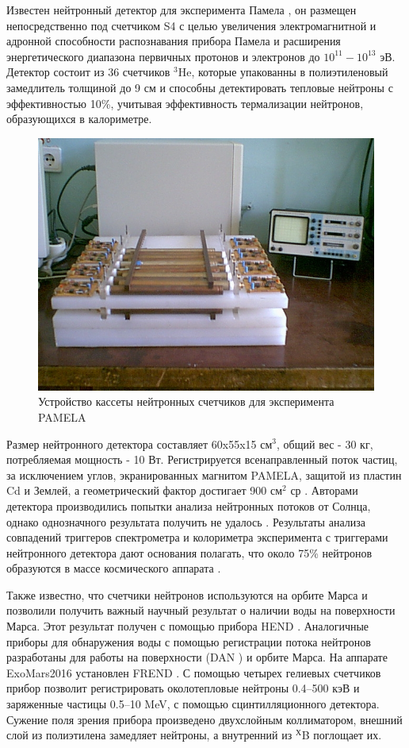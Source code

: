 Известен нейтронный детектор для эксперимента Памела \cite{Menn2013}, он размещен непосредственно под счетчиком S4 с целью увеличения электромагнитной и адронной способности распознавания прибора Памела и расширения энергетического диапазона первичных протонов и электронов до $ 10^{11}-10^{13} $ эВ. Детектор состоит из 36 счетчиков  $ ^{3} $He, которые упакованны в полиэтиленовый замедлитель толщиной до 9 см и способны детектировать тепловые нейтроны с эффективностью 10\%, учитывая эффективность термализации нейтронов, образующихся в калориметре.

\begin{figure}
	\centering
	\includegraphics[width=0.7\linewidth]{images/neutrons/pamela}
	\caption{Устройство кассеты нейтронных счетчиков для эксперимента PAMELA \cite{Stozhkov2007}}
	\label{fig:pamela}
\end{figure}

Размер нейтронного детектора составляет 60x55x15 см$ ^3 $, общий вес - 30 кг, потребляемая мощность - 10 Вт. Регистрируется всенаправленный поток частиц, за исключением углов, экранированных магнитом PAMELA, защитой из пластин Cd и Землей, а геометрический фактор достигает 900 см$ ^2 $ ср \cite{Stozhkov2007}. Авторами детектора производились попытки анализа нейтронных потоков от Солнца, однако однозначного результата получить не удалось \cite{Goryacheva2016}. Результаты анализа совпадений триггеров спектрометра и колориметра эксперимента с триггерами нейтронного детектора дают основания полагать, что около 75\% нейтронов образуются в массе космического аппарата \cite{Stozhkov2007}.

Также известно, что счетчики нейтронов используются на орбите Марса и позволили получить важный научный результат о наличии воды на поверхности Марса.  Этот  результат получен с помощью прибора HEND \cite{Feldman2004}. Аналогичные приборы для обнаружения воды с помощью регистрации потока нейтронов разработаны для работы на поверхности (DAN \cite{Mitrofanov2012a}) и орбите Марса. На аппарате ExoMars2016 установлен FREND \cite{Mitrofanov2012}. С помощью четырех гелиевых счетчиков прибор позволит регистрировать околотепловые нейтроны 0.4–500 кэВ и заряженные частицы 0.5–10 MeV, с помощью сцинтилляционного детектора. Сужение поля зрения прибора произведено двухслойным коллиматором, внешний слой из полиэтилена замедляет нейтроны, а внутренний из $ ^Х $B поглощает их. 

